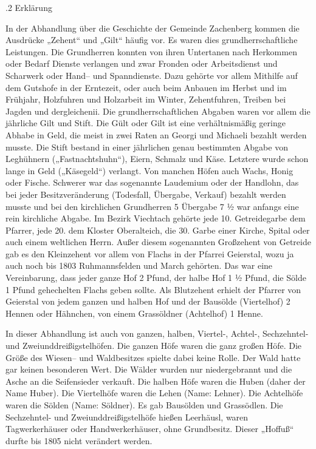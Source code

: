 .2 Erklärung

In der Abhandlung über die Geschichte der Gemeinde Zachenberg kommen die
Ausdrücke „Zehent“ und „Gilt“ häufig vor. Es waren dies grundherrschaftliche
Leistungen. Die Grundherren konnten von ihren Untertanen nach Herkommen oder
Bedarf Dienste verlangen und zwar Fronden oder Arbeitsdienst und Scharwerk oder
Hand– und Spanndienste. Dazu gehörte vor allem Mithilfe auf dem Gutshofe in der
Erntezeit, oder auch beim Anbauen im Herbst und im Frühjahr, Holzfuhren und
Holzarbeit im Winter, Zehentfuhren, Treiben bei Jagden und dergleichenii. Die
grundherrschaftlichen Abgaben waren vor allem die jährliche Gilt und Stift. Die
Gült oder Gilt ist eine verhältnismäßig geringe Abhabe in Geld, die meist in
zwei Raten an Georgi und Michaeli bezahlt werden musste. Die Stift bestand in
einer jährlichen genau bestimmten Abgabe von Leghühnern („Fastnachtshuhn“),
Eiern, Schmalz und Käse. Letztere wurde schon lange in Geld („Käsegeld“)
verlangt. Von manchen Höfen auch Wachs, Honig oder Fische. Schwerer war das
sogenannte Laudemium oder der Handlohn, das bei jeder Besitzveränderung
(Todesfall, Übergabe, Verkauf) bezahlt werden musste und bei den kirchlichen
Grundherren 5%
Übergabe 7 ½ %
war anfangs eine rein kirchliche Abgabe. Im Bezirk Viechtach gehörte jede 10.
Getreidegarbe dem Pfarrer, jede 20. dem Kloster Oberalteich, die 30. Garbe einer
Kirche, Spital oder auch einem weltlichen Herrn. Außer diesem sogenannten
Großzehent von Getreide gab es den Kleinzehent vor allem von Flachs in der
Pfarrei Geierstal, wozu ja auch noch bis 1803 Ruhmannsfelden und March gehörten.
Das war eine Vereinbarung, dass jeder ganze Hof 2 Pfund, der halbe Hof 1 ½
Pfund, die Sölde 1 Pfund gehechelten Flachs geben sollte. Als Blutzehent erhielt
der Pfarrer von Geierstal von jedem ganzen und halben Hof und der Bausölde
(Viertelhof) 2 Hennen oder Hähnchen, von einem Grassöldner (Achtelhof) 1 Henne.

In dieser Abhandlung ist auch von ganzen, halben, Viertel-, Achtel-,
Sechzehntel- und Zweiunddreißigstelhöfen. Die ganzen Höfe waren die ganz großen
Höfe. Die Größe des Wiesen– und Waldbesitzes spielte dabei keine Rolle. Der Wald
hatte gar keinen besonderen Wert. Die Wälder wurden nur niedergebrannt und die
Asche an die Seifensieder verkauft. Die halben Höfe waren die Huben (daher der
Name Huber). Die Viertelhöfe waren die Lehen (Name: Lehner). Die Achtelhöfe
waren die Sölden (Name: Söldner). Es gab Bausölden und Grassödlen. Die
Sechzehntel- und Zweiunddreißigstelhöfe hießen Leerhäusl, waren Tagwerkerhäuser
oder Handwerkerhäuser, ohne Grundbesitz. Dieser „Hoffuß“ durfte bis 1805 nicht
verändert werden.

